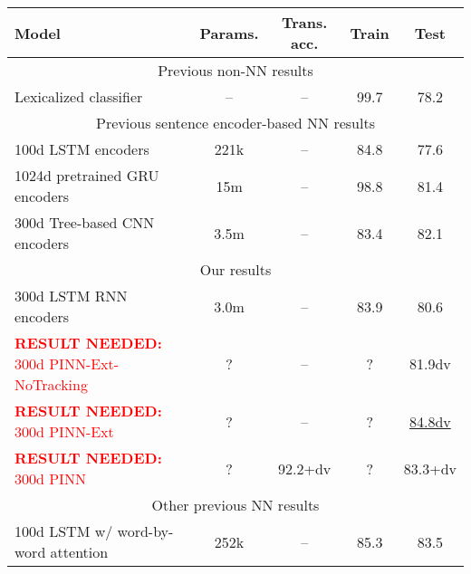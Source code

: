 \documentclass[11pt,letterpaper]{article}
\newcommand\result[1]{\textcolor{red}{\textbf{RESULT NEEDED:} #1}}
\begin{document}
\begin{table*}[t]
  \centering\small
  \begin{tabular}{lcccc} 
    \toprule
Model                   & Params.    & Trans. acc.  &   Train  &   Test \\
\midrule
\multicolumn{5}{c}{Previous non-NN results}\\
\midrule
Lexicalized classifier \cite{snli:emnlp2015}
                        & --                & --                    &   99.7   &   78.2      \\
\midrule
\multicolumn{5}{c}{Previous sentence encoder-based NN results}\\
\midrule
100d LSTM encoders \cite{snli:emnlp2015}
                        & 221k               & --               &   84.8   &   77.6      \\
1024d pretrained GRU encoders \cite{DBLP:journals/corr/VendrovKFU15}
                        & 15m                & --              &   98.8   &   81.4       \\
300d Tree-based CNN encoders \cite{mou2015recognizing}
                        & 3.5m                & --             &   83.4   &   82.1       \\
\midrule
\multicolumn{5}{c}{Our results}\\
\midrule
300d LSTM RNN encoders          & 3.0m                  & --                &   83.9      &   80.6       \\
\result{300d PINN-Ext-NoTracking}   
                        & ?                  & --                &   ?      &   81.9dv       \\
\result{300d PINN-Ext }
                        & ?                  & --                &   ?      &   \underline{84.8dv}       \\
\result{300d PINN }
                        & ?                  & 92.2+dv            &   ?    &   83.3+dv       \\          
\midrule
\multicolumn{5}{c}{Other previous NN results}\\
\midrule
100d LSTM w/ word-by-word attention \cite{rocktaschel2015reasoning}
                        & 252k               & --              &   85.3   &   83.5       \\

\end{tabular}
\end{table*}
\end{document}
